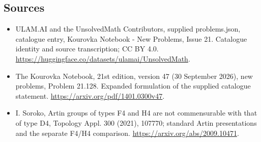 \documentclass[11pt,a4paper]{article}
\begin{document}
\subsection{Sources}
\begin{itemize}
\item[S1] ULAM.AI and the UnsolvedMath Contributors, supplied problems.json, catalogue entry, Kourovka Notebook - New Problems, Issue 21. Catalogue identity and source transcription; CC BY 4.0.
\url{https://huggingface.co/datasets/ulamai/UnsolvedMath}.
\item[S2] The Kourovka Notebook, 21st edition, version 47 (30 September 2026), new problems, Problem 21.128. Expanded formulation of the supplied catalogue statement.
\url{https://arxiv.org/pdf/1401.0300v47}.
\item[S3] I. Soroko, Artin groups of types F4 and H4 are not commensurable with that of type D4, Topology Appl. 300 (2021), 107770; standard Artin presentations and the separate F4/H4 comparison.
\url{https://arxiv.org/abs/2009.10471}.
\end{itemize}
\end{document}
